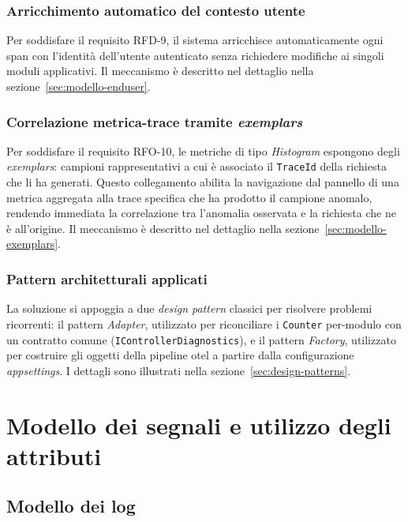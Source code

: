 \subsubsection{Arricchimento automatico del contesto utente}
\label{sec:enduser-middleware}

Per soddisfare il requisito RFD-9, il sistema arricchisce automaticamente ogni span con
l'identità dell'utente autenticato senza richiedere modifiche ai singoli moduli applicativi. Il
meccanismo è descritto nel dettaglio nella sezione~\ref{sec:modello-enduser}.

\subsubsection{Correlazione metrica-trace tramite \emph{exemplars}}
\label{sec:exemplars-design}

Per soddisfare il requisito RFO-10, le metriche di tipo \emph{Histogram} espongono degli
\emph{exemplars}: campioni rappresentativi a cui è associato il \texttt{TraceId} della richiesta che li ha
generati. Questo collegamento abilita la navigazione dal pannello di una metrica aggregata alla trace
specifica che ha prodotto il campione anomalo, rendendo immediata la correlazione tra l'anomalia osservata
e la richiesta che ne è all'origine. Il meccanismo è descritto nel dettaglio nella
sezione~\ref{sec:modello-exemplars}.

\subsubsection{Pattern architetturali applicati}
\label{sec:design-patterns-intro}

La soluzione si appoggia a due \emph{design pattern} classici per risolvere problemi ricorrenti:
il pattern \emph{Adapter}, utilizzato per riconciliare i \texttt{Counter} per-modulo con un
contratto comune (\texttt{IControllerDiagnostics}), e il pattern \emph{Factory}, utilizzato per
costruire gli oggetti della pipeline \gls{otel} a partire dalla configurazione \emph{appsettings}.
I dettagli sono illustrati nella sezione~\ref{sec:design-patterns}.

\section{Modello dei segnali e utilizzo degli attributi}
\subsection{Modello dei log}

